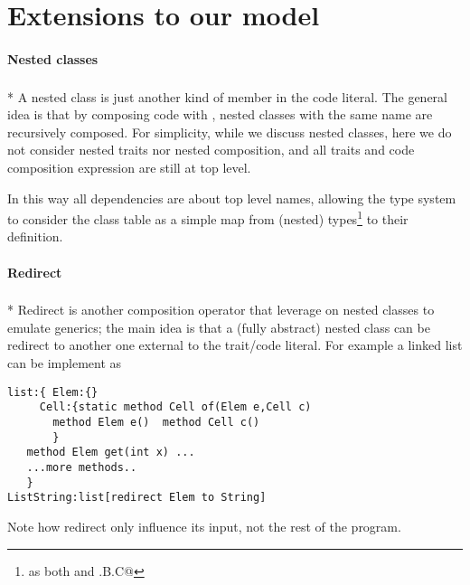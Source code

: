 \section{Extensions to our model}

\paragraph{Nested classes}${}_{}$\\*
A nested class is just another kind of member in the code literal.
The general idea is that by composing code with \use,
nested classes with the same name are recursively composed.
For simplicity, while we discuss nested classes,
here we do not consider nested traits nor nested composition,
and all traits and code composition expression are still at top level.

In this way all dependencies are about top level names, allowing the type system 
to consider the class table as a simple map from (nested) types\footnote{
as both \Q@A@ and \Q@A.B.C@}  to their definition.

\paragraph{Redirect}${}_{}$\\*
Redirect is another composition operator that
leverage on nested classes to emulate generics;
the main idea is that a (fully abstract) nested class can be redirect to
another one external to the trait/code literal.
For example a linked list can be implement as
\begin{lstlisting}
list:{ Elem:{}
     Cell:{static method Cell of(Elem e,Cell c) 
       method Elem e()  method Cell c()
       }
   method Elem get(int x) ...
   ...more methods..
   }
ListString:list[redirect Elem to String]
\end{lstlisting}
Note how redirect only influence its input, not the rest of the program.




